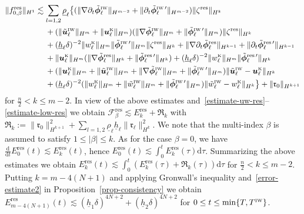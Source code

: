 \documentclass[11pt,leqno]{article}
\numberwithin{equation}{section}
\numberwithin{figure}{section}
\begin{document}
\begin{align*}
\|f_{0,\beta}^\mathrm{res}\|_{H^1}
&\lesssim \sum_{l=1,2}\underline{\rho}_\ell\bigl\{
 (\|\nabla\partial_t\tilde{\bm{\phi}}_\ell^{\mbox{\rm\tiny IW}}\|_{H^{m-2}}
  + \|\partial_t\tilde{\bm{\phi}}_\ell^{\mbox{\rm\tiny IW} \, \prime}\|_{H^{m-2}})\|\zeta^\mathrm{res}\|_{H^k} \\
&\quad\;
  + (\|\tilde{\bm{u}}_\ell^{\mbox{\rm\tiny IW}}\|_{H^m}+\|\bm{u}_\ell^{\mbox{\rm\tiny K}}\|_{H^m})
   (\|\nabla\tilde{\bm{\phi}}_\ell^{\mbox{\rm\tiny IW}}\|_{H^m}
  + \|\tilde{\bm{\phi}}_\ell^{\mbox{\rm\tiny IW} \, \prime}\|_{H^m})\|\zeta^\mathrm{res}\|_{H^k} \\
&\quad\;
 + (\underline{h}_\ell\delta)^{-2}\|w_\ell^{\mbox{\rm\tiny K}}\|_{H^m}
  \|\tilde{\bm{\phi}}_\ell^{\mbox{\rm\tiny IW} \, \prime}\|_{H^m}\|\zeta^\mathrm{res}\|_{H^k} 
 + \|\nabla\partial_t\tilde{\bm{\phi}}_\ell^\mathrm{res}\|_{H^{k-1}}
  + \|\partial_t\tilde{\bm{\phi}}_\ell^{\mathrm{res} \, \prime}\|_{H^{k-1}} \\
&\quad\;
 + \|\bm{u}_\ell^{\mbox{\rm\tiny K}}\|_{H^m} (\|\nabla\tilde{\bm{\phi}}_\ell^\mathrm{res}\|_{H^k}
  + \|\tilde{\bm{\phi}}_\ell^{\mathrm{res} \, \prime}\|_{H^k} )
 + (\underline{h}_\ell\delta)^{-2}\|w_\ell^{\mbox{\rm\tiny K}}\|_{H^m}
  \|\tilde{\bm{\phi}}_\ell^{\mathrm{res} \, \prime}\|_{H^k} \\
&\quad\;
 + (\|\bm{u}_\ell^{\mbox{\rm\tiny K}}\|_{H^m} + \|\tilde{\bm{u}}_\ell^{\mbox{\rm\tiny IW}}\|_{H^m}
  + \|\nabla\tilde{\bm{\phi}}_\ell^{\mbox{\rm\tiny IW}}\|_{H^m}
  + \|\tilde{\bm{\phi}}_\ell^{\mbox{\rm\tiny IW} \, \prime}\|_{H^m} )
   \|\tilde{\bm{u}}_\ell^{\mbox{\rm\tiny IW}}-\bm{u}_\ell^{\mbox{\rm\tiny K}}\|_{H^k} \\
&\quad\;
 + (\underline{h}_\ell\delta)^{-2}( \|w_\ell^{\mbox{\rm\tiny K}}\|_{H^m}
  + \|\tilde{w}_\ell^{\mbox{\rm\tiny IW}}\|_{H^m} + \|\tilde{\bm{\phi}}_\ell^{\mbox{\rm\tiny IW} \, \prime}\|_{H^m} )
  \|\tilde{w}_\ell^{\mbox{\rm\tiny IW}}-w_\ell^{\mbox{\rm\tiny K}}\|_{H^k} \bigr\} 
 + \|\mathfrak{r}_0\|_{H^{k+1}}
\end{align*}
%
for $\frac{n}{2}<k\leq m-2$. 
In view of the above estimates and~\eqref{estimate-uw-res}--\eqref{estimate-low-res} we obtain
$\mathscr{F}_\beta^\mathrm{res} \lesssim E_k^\mathrm{res} + \mathfrak{R}_k$ with 
$\mathfrak{R}_k := \|\mathfrak{r}_0\|_{H^{k+1}}^2 + \sum_{l=1,2}\underline{\rho}_\ell\underline{h}_\ell\|\bm{\mathfrak{r}}_\ell\|_{H^k}^2$. 
We note that the multi-index $\beta$ is assumed to satisfy $1\leq|\beta|\leq k$. 
As for the case $\beta=0$, we have $\frac{\mathrm{d}}{\mathrm{d}t}E_0^\mathrm{res}(t) \lesssim E_k^\mathrm{res}(t)$, 
hence ${E_0^\mathrm{res}(t) \lesssim \int_0^tE_k^\mathrm{res}(\tau)\mathrm{d}\tau}$. 
Summarizing the above estimates we obtain 
$E_k^\mathrm{res}(t) \lesssim \int_0^t(E_k^\mathrm{res}(\tau)+\mathfrak{R}_k(\tau))\mathrm{d}\tau$ for $\frac{n}{2}<k\leq m-2$. 
Putting ${k=m-4(N+1)}$ and applying Gronwall's inequality and~\eqref{error-estimate2} in Proposition~\ref{prop-consistency} 
we obtain $E_{m-4(N+1)}^\mathrm{res}(t) \lesssim (\underline{h}_1\delta)^{4N+2}+(\underline{h}_2\delta)^{4N+2}$ 
for $0\leq t\leq \min\{T,T^{\mbox{\tiny\rm IW}}\}$. 
\end{document}

